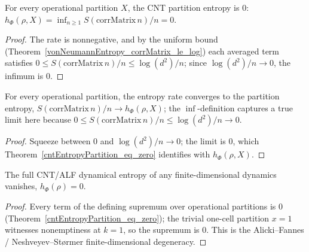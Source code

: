 \begin{theorem}\label{cntEntropyPartition_eq_zero}
  \leanok
  For every operational partition \(X\), the CNT partition entropy is \(0\):
  \(h_\Phi(\rho,X) = \inf_{n\ge 1}S(\mathrm{corrMatrix}\,n)/n = 0\).
\end{theorem}
\begin{proof}\leanok
  The rate is nonnegative, and by the uniform bound
  (Theorem~\ref{vonNeumannEntropy_corrMatrix_le_log}) each averaged term satisfies
  \(0\le S(\mathrm{corrMatrix}\,n)/n\le\log(d^{2})/n\); since \(\log(d^{2})/n\to 0\), the infimum is
  \(0\).
\end{proof}

\begin{theorem}\label{tendsto_cntEntropySeq_div}
  \leanok
  For every operational partition, the entropy rate converges to the partition entropy,
  \(S(\mathrm{corrMatrix}\,n)/n\to h_\Phi(\rho,X)\); the \(\inf\)-definition captures a true limit
  here because \(0\le S(\mathrm{corrMatrix}\,n)/n\le\log(d^{2})/n\to 0\).
\end{theorem}
\begin{proof}\leanok
  Squeeze between \(0\) and \(\log(d^{2})/n\to 0\); the limit is \(0\), which
  Theorem~\ref{cntEntropyPartition_eq_zero} identifies with \(h_\Phi(\rho,X)\).
\end{proof}

\begin{theorem}\label{cntDynamicalEntropy_eq_zero}
  \leanok
  The full CNT/ALF dynamical entropy of any finite-dimensional dynamics vanishes,
  \(h_\Phi(\rho) = 0\).
\end{theorem}
\begin{proof}\leanok
  Every term of the defining supremum over operational partitions is \(0\)
  (Theorem~\ref{cntEntropyPartition_eq_zero}); the trivial one-cell partition \(x = 1\) witnesses
  nonemptiness at \(k = 1\), so the supremum is \(0\). This is the Alicki--Fannes / Neshveyev--Størmer
  finite-dimensional degeneracy.
\end{proof}

